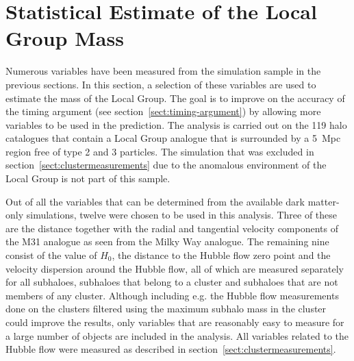 \documentclass[english, twoside]{HYgradu}
\begin{document}



\section{Statistical Estimate of the Local Group Mass}\label{sect:statistical_estimate}
Numerous variables have been measured from the simulation sample in the previous sections. In this section, a selection of these variables are used to estimate the mass of the Local Group. The goal is to improve on the accuracy of the timing argument (see section~\ref{sect:timing-argument}) by allowing more variables to be used in the prediction. The analysis is carried out on the 119 halo catalogues that contain a Local Group analogue that is surrounded by a 5~Mpc region free of type 2 and 3 particles. The simulation that was excluded in section~\ref{sect:clustermeasurements} due to the anomalous environment of the Local Group is not part of this sample.

Out of all the variables that can be determined from the available dark matter-only simulations, twelve were chosen to be used in this analysis. Three of these are the distance together with the radial and tangential velocity components of the M31 analogue as seen from the Milky Way analogue. The remaining nine consist of the value of $H_0$, the distance to the Hubble flow zero point and the velocity dispersion around the Hubble flow, all of which are measured separately for all subhaloes, subhaloes that belong to a cluster and subhaloes that are not members of any cluster. Although including e.g. the Hubble flow measurements done on the clusters filtered using the maximum subhalo mass in the cluster could improve the results, only variables that are reasonably easy to measure for a large number of objects are included in the analysis. All variables related to the Hubble flow were measured as described in section~\ref{sect:clustermeasurements}.
\end{document}

